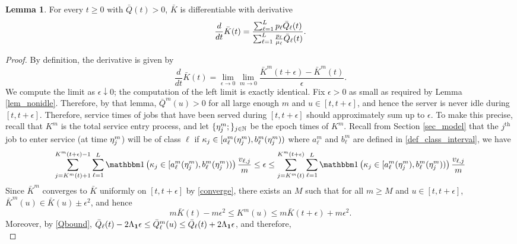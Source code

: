 \documentclass{article}
\theoremstyle{definition}
\newtheorem{lemma}[theorem]{Lemma}
\numberwithin{equation}{section}
\begin{document}
\begin{lemma}
  For every $t\geq0$ with $\bar Q(t)>0$,  $\bar K$ is differentiable with derivative
  \begin{equation}\label{Kdot}
    \frac{d}{dt}\bar K(t)= \frac{\sum_{\ell=1}^{L}p_{\ell}\bar Q_{\ell}(t)}{\sum_{\ell=1}^{L}\frac{p_{\ell}}{\mu_{\ell}}\bar Q_{\ell}(t)}.
  \end{equation}
\end{lemma}

\begin{proof}
  By definition, the derivative is given by
  \[
  \frac{d}{dt}\bar K(t) = \lim_{\epsilon\to 0} \lim_{m\to 0} \frac{\bar K^m(t+\epsilon)-\bar K^m(t)}{\epsilon}.
  \]
  We compute the limit as $\epsilon\downarrow 0$; the computation of the left limit is exactly identical. Fix $\epsilon>0$ as small as required by Lemma \ref{lem_nonidle}. Therefore, by that lemma, $\bar Q^m(u)>0$ for all large enough $m$ and $u\in[t,t+\epsilon]$, and hence the server is never idle during $[t,t+\epsilon]$. Therefore, service times of jobs that have been served during $[t,t+\epsilon]$ should approximately sum up to $\epsilon$. To make this precise, recall that $K^m$ is the total service entry process, and let $\{\eta^m_j;\}_{j\in\mathbb{N}}$ be the epoch times of $K^m$. Recall from Section \ref{sec_model} that the $j^\text{th}$ job to enter service (at time $\eta^m_j$) will be of class $\ell$ if $\kappa_j\in[a^m_\ell(\eta^m_j),b^m_\ell(\eta^m_j))$ where $a^m_\ell$ and $b^m_\ell$ are defined in \ref{def_class_interval}, we have
  \begin{align}\label{nonIdligBound}
    \sum_{j=K^m(t)+1}^{K^m(t+\epsilon)-1}\sum_{\ell=1}^{L}\indic{\selector_j\in[a^m_\ell(\Ktime^m_j),b^m_\ell(\Ktime^m_j))} \frac{v_{\ell,j}}{m} \leq \epsilon \leq \sum_{j=K^m(t)}^{K^m(t+\epsilon)}\sum_{\ell=1}^{L}\indic{\selector_j\in[a^m_\ell(\Ktime^m_j),b^m_\ell(\Ktime^m_j))} \frac{v_{\ell,j}}{m}
  \end{align}
Since $\bar K^m$ converges to $\bar K$ uniformly on $[t,t+\epsilon]$ by \eqref{converge}, there exists an $M$ such that for all $m\geq M$ and $u\in[t,t+\epsilon]$, $\bar K^m(u)\in\bar K(u)\pm \epsilon^2$, and hence
\begin{equation}\label{Kbound}
  m\bar K(t)-m\epsilon^2\leq K^m(u)\leq m\bar K(t+\epsilon)+m\epsilon^2.
\end{equation}
Moreover, by \eqref{Qbound}, $\bar Q_\ell(t)-2\Lip_\f1\epsilon\leq \bar Q^m_\ell(u)\leq \bar Q_\ell(t)+2\Lip_\f1\epsilon$, and therefore,
\begin{equation}\label{abBound}

\end{equation}
\end{proof}
\end{document}
